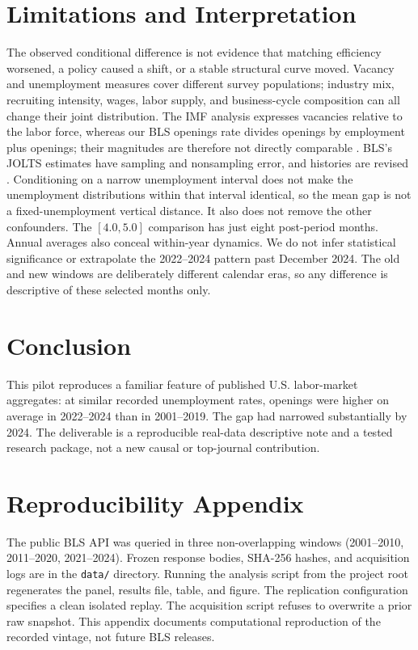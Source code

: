 \documentclass[10pt]{article}
\begin{document}
\section{Limitations and Interpretation}
The observed conditional difference is not evidence that matching efficiency worsened, a policy caused a shift, or a stable structural curve moved. Vacancy and unemployment measures cover different survey populations; industry mix, recruiting intensity, wages, labor supply, and business-cycle composition can all change their joint distribution. The IMF analysis expresses vacancies relative to the labor force, whereas our BLS openings rate divides openings by employment plus openings; their magnitudes are therefore not directly comparable \citep{KindbergGirard2024}. BLS's JOLTS estimates have sampling and nonsampling error, and histories are revised \citep{BLSJOLTS}. Conditioning on a narrow unemployment interval does not make the unemployment distributions within that interval identical, so the mean gap is not a fixed-unemployment vertical distance. It also does not remove the other confounders. The $[4.0,5.0]$ comparison has just eight post-period months. Annual averages also conceal within-year dynamics. We do not infer statistical significance or extrapolate the 2022--2024 pattern past December 2024. The old and new windows are deliberately different calendar eras, so any difference is descriptive of these selected months only.

\section{Conclusion}
This pilot reproduces a familiar feature of published U.S. labor-market aggregates: at similar recorded unemployment rates, openings were higher on average in 2022--2024 than in 2001--2019. The gap had narrowed substantially by 2024. The deliverable is a reproducible real-data descriptive note and a tested research package, not a new causal or top-journal contribution.

\section{Reproducibility Appendix}
The public BLS API was queried in three non-overlapping windows (2001--2010, 2011--2020, 2021--2024). Frozen response bodies, SHA-256 hashes, and acquisition logs are in the \texttt{data/} directory. Running the analysis script from the project root regenerates the panel, results file, table, and figure. The replication configuration specifies a clean isolated replay. The acquisition script refuses to overwrite a prior raw snapshot. This appendix documents computational reproduction of the recorded vintage, not future BLS releases.

\begingroup\scriptsize\setlength{\bibsep}{0pt}


\endgroup
\end{document}
